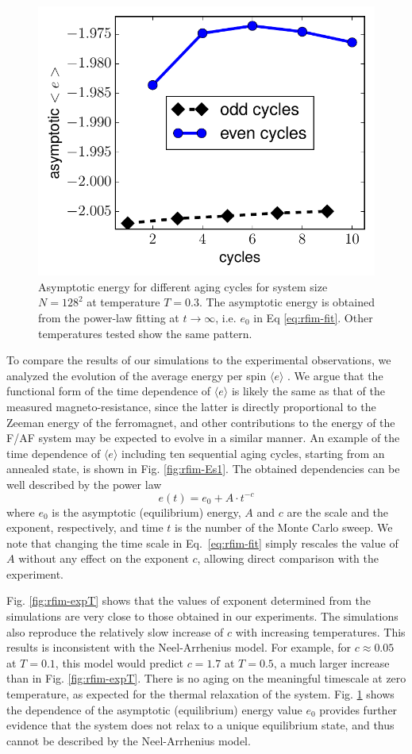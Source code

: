 \begin{figure}
\centering \includegraphics[width=0.5\columnwidth]{Chapter-4/asymptotic_E_T03_10cycles}
\protect\caption{Asymptotic energy for different aging cycles for system size $N=128^2$ at temperature $T=0.3$. The asymptotic energy is obtained from the power-law fitting at $t\rightarrow\infty$, i.e. $e_0$ in Eq \ref{eq:rfim-fit}. Other temperatures tested show the same pattern.} 
\label{fig:rfim-asm}
\end{figure}

To compare the results of our simulations to the experimental observations, we analyzed the evolution of the average
energy per spin $\langle e \rangle$ . We argue that the functional form of the time dependence of $\langle e \rangle$ is likely the same as that of the measured magneto-resistance, since the latter is directly proportional to the Zeeman energy of the ferromagnet, and other contributions to the energy of the F/AF system may be expected to evolve in a similar manner. An example of the time dependence of $\langle e \rangle$ including ten sequential aging cycles, starting from an annealed state, is shown in Fig. \ref{fig:rfim-Es1}. The obtained dependencies can be well described by the power law
\begin{equation}
e(t)=e_{0}+A\cdot  t^{-c}
\label{eq:rfim-fit}
\end{equation}
where $e_{0}$ is the asymptotic (equilibrium) energy, $A$ and $c$ are the scale and the exponent, respectively, and time $t$ is the number of the Monte Carlo sweep. We note that  changing the time scale in Eq.~\ref{eq:rfim-fit} simply rescales the value of $A$ without any effect on the exponent $c$, allowing direct comparison with the experiment. 

Fig. \ref{fig:rfim-expT} shows that the values of exponent determined from the simulations are very close to those obtained in our experiments. The simulations also reproduce the relatively slow increase of $c$ with increasing temperatures. This results is inconsistent with the Neel-Arrhenius model. For example, for $c \approx 0.05$ at $T=0.1$, this model would predict $c=1.7$ at $T=0.5$, a much larger increase than in Fig. \ref{fig:rfim-expT}. There is no aging on the meaningful timescale at zero temperature, as expected for the thermal relaxation of the system. Fig. \ref{fig:rfim-asm} shows the dependence of the asymptotic (equilibrium) energy value $e_0$ provides further evidence that the system does not relax to a unique equilibrium state, and thus cannot be described by the Neel-Arrhenius model.



